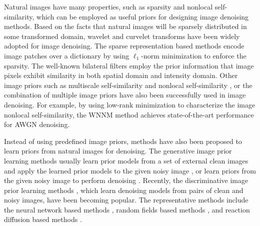 Natural images have many properties, such as sparsity and nonlocal self-similarity, which can be employed as useful priors for designing image denoising methods. Based on the facts that natural images will be sparsely distributed in some transformed domain, wavelet \cite{bayesshrink} and curvelet \cite{curvelet} transforms have been widely adopted for image denoising. The sparse representation based methods \cite{ksvd,lssc,ncsr,bm3d,cbm3d,
zhou2012nonparametric} encode image patches over a dictionary by using $\ell_{1}$-norm minimization to enforce the sparsity. The well-known bilateral filters \cite{Tomasi1998} employ the prior information that image pixels exhibit similarity in both spatial domain and intensity domain. Other image priors such as multiscale self-similarity \cite{blsgsm} and nonlocal self-similarity \cite{nlm,nlbayes}, or the combination of multiple image priors \cite{wnnm,pgpd} have also been successfully used in image denoising. For example, by using low-rank minimization to characterize the image nonlocal self-similarity, the WNNM \cite{wnnm} method achieves state-of-the-art performance for AWGN denoising. 

Instead of using predefined image priors, methods have also been proposed to learn priors from natural images for denoising. The generative image prior learning methods usually learn prior models from a set of external clean images and apply the learned prior models to the given noisy image \cite{foe,epll,pgpd}, or learn priors from the given noisy image to perform denoising \cite{ksvd}. Recently, the discriminative image prior learning methods \cite{mlp,xie2012image,zhang2017beyond,
chen2015learning,
barbu2009training,csf}, which learn denoising models from pairs of clean and noisy images, have been becoming popular. The representative methods include the neural network based methods \cite{mlp,xie2012image,zhang2017beyond}, random fields based methods \cite{barbu2009training,csf}, and reaction diffusion based methods \cite{chen2015learning}.
 
